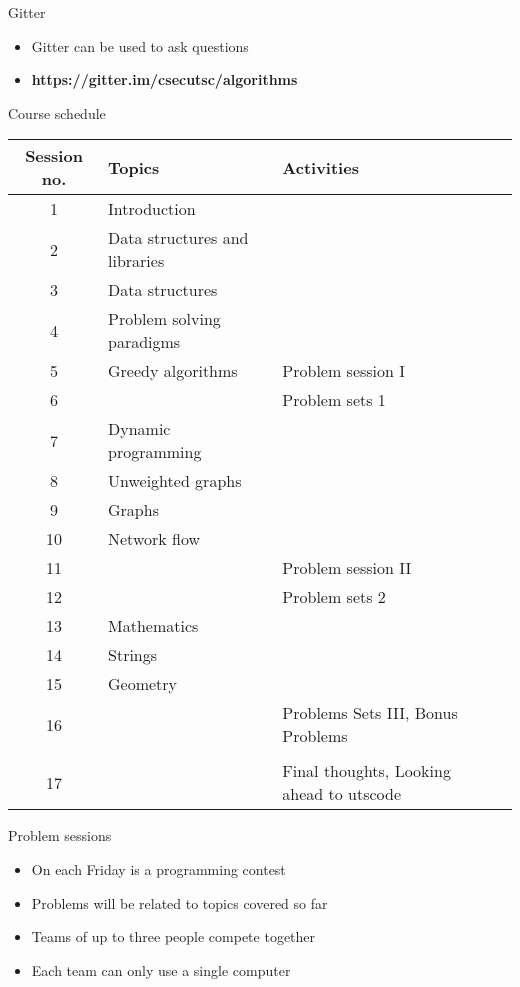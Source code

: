 \documentclass[10pt]{beamer}
\newcommand{\bi}{\begin{itemize}}
\newcommand{\ei}{\end{itemize}}
\begin{document}
\begin{frame}{Gitter}
    \bi
        \item Gitter can be used to ask questions
        \item \textbf{https://gitter.im/csecutsc/algorithms}
    \ei
\end{frame}

\begin{frame}{Course schedule}
    \scriptsize
    \begin{center}
	        \begin{tabular}{cl|ll}
		            Session no. & Topics & Activities \\
		            \hline
		            1 & Introduction & \\
		            2 & Data structures and libraries & \\
		            3 & Data structures & \\
		            4 & Problem solving paradigms & \\
		            5 & Greedy algorithms & Problem session I \\
		            \hline
		              6& & Problem sets  1 \\
		            \hline
		            7 & Dynamic programming & \\
		            8 & Unweighted graphs & \\
		            9 & Graphs & \\
		            10 & Network flow & \\
		            11 & & Problem session II \\
		            \hline
		              12 & & Problem sets  2 \\
		            \hline
		            13 & Mathematics & \\
		            14 & Strings & \\
		            15 & Geometry & \\
		            16 &  & Problems Sets III, Bonus Problems \\
		            \hline
		              & & \\
		              17 & & Final thoughts, Looking ahead to utscode \\
		            \hline
		        \end{tabular}
	    \end{center}
\end{frame}

\begin{frame}{Problem sessions}
    \bi
        \item On each Friday is a programming contest
        \item Problems will be related to topics covered so far
        \item Teams of up to three people compete together
        \item Each team can only use a single computer
    \ei
\end{frame}
\end{document}
